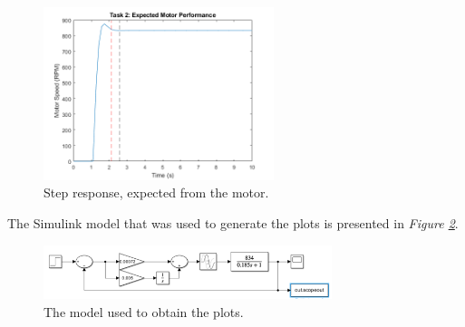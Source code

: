 \documentclass[11pt, onecolumn]{article}
\begin{document}
\begin{figure}[h!]
    \centering
    \includegraphics[width=0.6\textwidth]{q2-g4.png}
    \caption{Step response, expected from the motor.}
    \label{fig:q2-third}
\end{figure}
\par The Simulink model that was used to generate the plots is presented in \textit{Figure \ref{fig:q2-model}}.
\begin{figure}[h!]
    \centering
    \includegraphics[width=0.75\textwidth]{q2-model.png}
    \caption{The model used to obtain the plots.}
    \label{fig:q2-model}
\end{figure}
\end{document}
